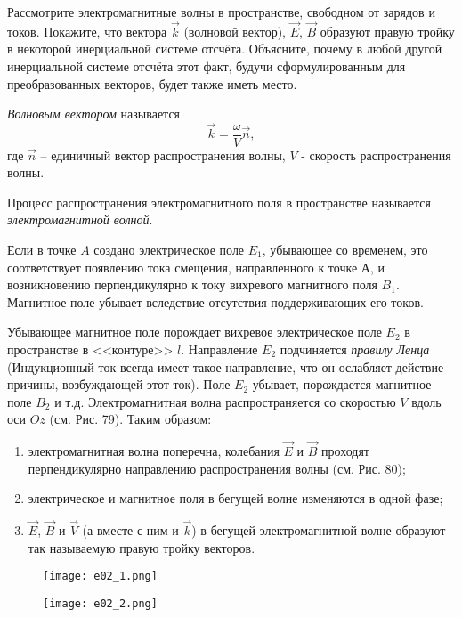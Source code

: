\documentclass[__main__.tex]{subfiles}
\begin{document}
Рассмотрите электромагнитные волны в пространстве, свободном от зарядов и токов. Покажите, что вектора $\vec{k}$ (волновой вектор), $\vec{E}$, $\vec{B}$ образуют правую тройку в некоторой инерциальной системе отсчёта. Объясните, почему в любой другой инерциальной системе отсчёта этот факт, будучи сформулированным для преобразованных векторов, будет также иметь место.\\

\begin{definition}
\textit{Волновым вектором} называется
$$
\vec{k}=\frac{\omega}{V}\vec{n},
$$
где $\vec{n}$ -- единичный вектор распространения волны, $V$ - скорость распространения волны.
\end{definition}

\begin{definition}
Процесс распространения электромагнитного поля в пространстве называется \textit{электромагнитной волной}.
\end{definition}

Если в точке $A$ создано электрическое поле $E_1$, убывающее со временем, это соответствует появлению тока смещения, направленного к точке А, и возникновению перпендикулярно к току вихревого магнитного поля $B_1$. Магнитное поле убывает вследствие отсутствия поддерживающих его токов.

Убывающее магнитное поле порождает вихревое электрическое поле $E_2$ в пространстве в <<контуре>> $l$. Направление $E_2$ подчиняется \textit{правилу Ленца} (Индукционный ток всегда имеет такое направление, что он ослабляет действие причины, возбуждающей этот ток). Поле $E_2$ убывает, порождается магнитное поле $B_2$ и т.д. Электромагнитная волна распространяется со скоростью $V$ вдоль оси $Oz$ (см. Рис. 79). Таким образом:

\begin{enumerate}
\item
электромагнитная волна поперечна, колебания $\vec{E}$ и $\vec{B}$ проходят перпендикулярно направлению распространения волны (см. Рис. 80);
\item
электрическое и магнитное поля в бегущей волне изменяются в одной фазе;
\item
$\vec{E}$, $\vec{B}$ и $\vec{V}$ (а вместе с ним и $\vec{k}$) в бегущей электромагнитной волне образуют так называемую правую тройку векторов.
\end{enumerate}

\begin{figure}[h]
\begin{minipage}{.6\linewidth}
    \texttt{[image: e02\_1.png]}
\end{minipage}
\hfill
\begin{minipage}{.4\linewidth}
    \texttt{[image: e02\_2.png]}
\end{minipage}
\end{figure}
\end{document}

